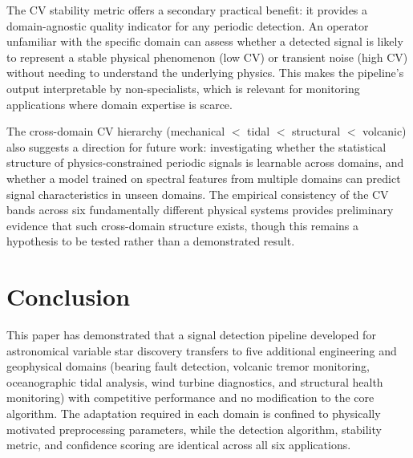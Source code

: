 \documentclass[11pt,a4paper]{article}
\begin{document}
The CV stability metric offers a secondary practical benefit: it provides a domain-agnostic quality indicator for any periodic detection. An operator unfamiliar with the specific domain can assess whether a detected signal is likely to represent a stable physical phenomenon (low CV) or transient noise (high CV) without needing to understand the underlying physics. This makes the pipeline's output interpretable by non-specialists, which is relevant for monitoring applications where domain expertise is scarce.

The cross-domain CV hierarchy (mechanical $<$ tidal $<$ structural $<$ volcanic) also suggests a direction for future work: investigating whether the statistical structure of physics-constrained periodic signals is learnable across domains, and whether a model trained on spectral features from multiple domains can predict signal characteristics in unseen domains. The empirical consistency of the CV bands across six fundamentally different physical systems provides preliminary evidence that such cross-domain structure exists, though this remains a hypothesis to be tested rather than a demonstrated result.


\section{Conclusion}
\label{sec:conclusion}

This paper has demonstrated that a signal detection pipeline developed for astronomical variable star discovery transfers to five additional engineering and geophysical domains (bearing fault detection, volcanic tremor monitoring, oceanographic tidal analysis, wind turbine diagnostics, and structural health monitoring) with competitive performance and no modification to the core algorithm. The adaptation required in each domain is confined to physically motivated preprocessing parameters, while the detection algorithm, stability metric, and confidence scoring are identical across all six applications.
\end{document}
